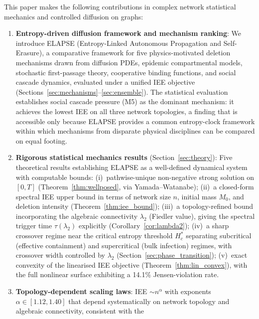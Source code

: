 \documentclass[review,12pt]{elsarticle}
\newcommand{\Hc}{H_c}
\begin{document}
This paper makes the following contributions in complex network statistical
mechanics and controlled diffusion on graphs:
\begin{enumerate}
  \item \textbf{Entropy-driven diffusion framework and mechanism ranking}:
        We introduce ELAPSE (Entropy-Linked Autonomous Propagation and
        Self-Erasure), a comparative framework for five physics-motivated
        deletion mechanisms drawn from diffusion PDEs, epidemic compartmental
        models, stochastic first-passage theory, cooperative binding functions,
        and social cascade dynamics, evaluated under a unified IEE objective
        (Sections~\ref{sec:mechanisms}--\ref{sec:ensemble}).  The statistical
        evaluation establishes social cascade pressure (M5) as the
        dominant mechanism: it achieves the lowest IEE on all three
        network topologies, a finding that is accessible only because
        ELAPSE provides a common entropy-clock framework within which
        mechanisms from disparate physical disciplines can be compared
        on equal footing.
  \item \textbf{Rigorous statistical mechanics results}
        (Section~\ref{sec:theory}): Five theoretical results establishing
        ELAPSE as a well-defined dynamical system with computable bounds:
        (i)~pathwise-unique non-negative strong solution on $[0,T]$
        (Theorem~\ref{thm:wellposed}, via Yamada--Watanabe);
        (ii)~a closed-form spectral IEE upper bound in terms of network size $n$,
        initial mass $M_0$, and deletion intensity
        (Theorem~\ref{thm:iee_bound});
        (iii)~a topology-refined bound incorporating the algebraic connectivity
        $\lambda_2$ (Fiedler value), giving the spectral trigger time
        $\tau(\lambda_2)$ explicitly (Corollary~\ref{cor:lambda2});
        (iv)~a sharp crossover regime near the critical entropy
        threshold $\Hc^*$ separating subcritical (effective containment)
        and supercritical (bulk infection) regimes, with crossover width
        controlled by $\lambda_2$ (Section~\ref{sec:phase_transition});
        (v)~exact convexity of the linearised IEE objective
        (Theorem~\ref{thm:lin_convex}), with the full nonlinear surface
        exhibiting a 14.1\% Jensen-violation rate.
  \item \textbf{Topology-dependent scaling laws}: IEE $\sim n^\alpha$ with
        exponents $\alpha \in [1.12, 1.40]$ that depend systematically on
        network topology and algebraic connectivity, consistent with the

\end{enumerate}
\end{document}
